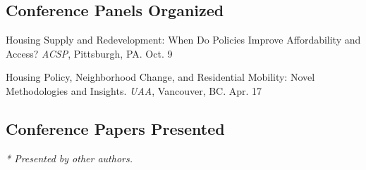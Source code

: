 \documentclass[11pt,letterpaper]{article}
\begin{document}
\subsection{Conference Panels Organized}
\begin{tablist}
  \item[2026] \tab{}Housing Supply and Redevelopment: When Do Policies Improve Affordability and Access? \emph{ACSP}, Pittsburgh, PA. Oct. 9
  \item[2025] \tab{}Housing Policy, Neighborhood Change, and Residential Mobility: Novel Methodologies and Insights. \emph{UAA}, Vancouver, BC. Apr. 17
\end{tablist}

\subsection{Conference Papers Presented}
{\footnotesize\emph{* Presented by other authors.}}\par\vspace{.35\baselineskip}
\end{document}
